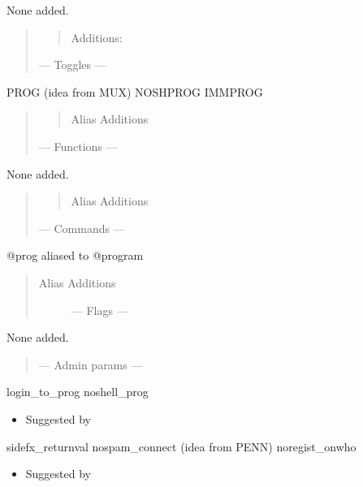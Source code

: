 \documentclass[letterpaper,10pt,english]{sphinxmanual}
\begin{document}
\sphinxAtStartPar
None added.
\begin{quote}
\begin{quote}

\sphinxAtStartPar
Additions:
\end{quote}

\sphinxAtStartPar
— Toggles —
\end{quote}

\sphinxAtStartPar
PROG (idea from MUX)
NOSHPROG
IMMPROG
\begin{quote}
\begin{quote}

\sphinxAtStartPar
Alias Additions
\end{quote}

\sphinxAtStartPar
— Functions —
\end{quote}

\sphinxAtStartPar
None added.
\begin{quote}
\begin{quote}

\sphinxAtStartPar
Alias Additions
\end{quote}

\sphinxAtStartPar
—  Commands —
\end{quote}

\sphinxAtStartPar
@prog aliased to @program
\begin{quote}
\begin{description}
\item[{Alias Additions}] \leavevmode
\sphinxAtStartPar
— Flags —

\end{description}
\end{quote}

\sphinxAtStartPar
None added.
\begin{quote}

\sphinxAtStartPar
— Admin params —
\end{quote}

\sphinxAtStartPar
login\_to\_prog
noshell\_prog
\begin{itemize}
\item {} 
\sphinxAtStartPar
Suggested by 

\end{itemize}

\sphinxAtStartPar
sidefx\_returnval
nospam\_connect (idea from PENN)
noregist\_onwho
\begin{itemize}
\item {} 
\sphinxAtStartPar
Suggested by 

\end{itemize}
\end{document}
